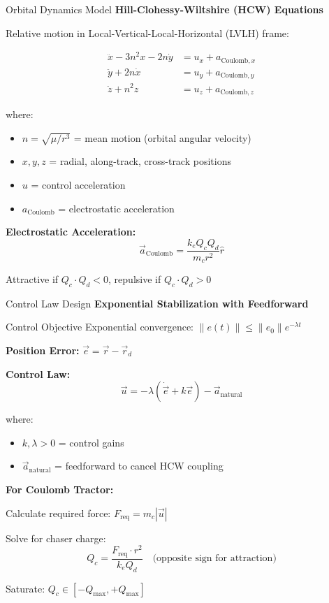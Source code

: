 \documentclass[aspectratio=169]{beamer}
\begin{document}
\begin{frame}{Orbital Dynamics Model}
\textbf{Hill-Clohessy-Wiltshire (HCW) Equations}

Relative motion in Local-Vertical-Local-Horizontal (LVLH) frame:

\begin{align}
\ddot{x} - 3n^2x - 2n\dot{y} &= u_x + a_{\text{Coulomb},x} \\
\ddot{y} + 2n\dot{x} &= u_y + a_{\text{Coulomb},y} \\
\ddot{z} + n^2z &= u_z + a_{\text{Coulomb},z}
\end{align}

where:
\begin{itemize}
    \item $n = \sqrt{\mu/r^3}$ = mean motion (orbital angular velocity)
    \item $x, y, z$ = radial, along-track, cross-track positions
    \item $u$ = control acceleration
    \item $a_{\text{Coulomb}}$ = electrostatic acceleration
\end{itemize}

\textbf{Electrostatic Acceleration:}
\begin{equation}
\vec{a}_{\text{Coulomb}} = \frac{k_e Q_c Q_d}{m_c r^2} \hat{r}
\end{equation}

Attractive if $Q_c \cdot Q_d < 0$, repulsive if $Q_c \cdot Q_d > 0$
\end{frame}

\begin{frame}{Control Law Design}
\textbf{Exponential Stabilization with Feedforward}

\begin{block}{Control Objective}
Exponential convergence: $\|e(t)\| \leq \|e_0\| e^{-\lambda t}$
\end{block}

\textbf{Position Error:} $\vec{e} = \vec{r} - \vec{r}_d$

\textbf{Control Law:}
\begin{equation}
\vec{u} = -\lambda(\dot{\vec{e}} + k\vec{e}) - \vec{a}_{\text{natural}}
\end{equation}

where:
\begin{itemize}
    \item $k, \lambda > 0$ = control gains
    \item $\vec{a}_{\text{natural}}$ = feedforward to cancel HCW coupling
\end{itemize}

\textbf{For Coulomb Tractor:}

Calculate required force: $F_{\text{req}} = m_c |\vec{u}|$

Solve for chaser charge:
\begin{equation}
Q_c = \frac{F_{\text{req}} \cdot r^2}{k_e Q_d} \quad \text{(opposite sign for attraction)}
\end{equation}

Saturate: $Q_c \in [-Q_{\max}, +Q_{\max}]$
\end{frame}
\end{document}
